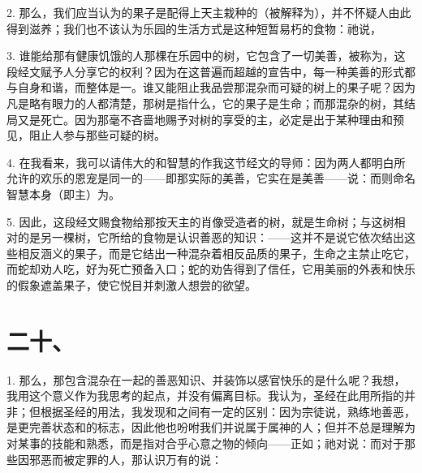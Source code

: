 2. 那么，我们应当认为的果子是配得上天主栽种的（被解释为），并不怀疑人由此得到滋养；我们也不该认为乐园的生活方式是这种短暂易朽的食物：祂说，\par

3. 谁能给那有健康饥饿的人那棵在乐园中的树，它包含了一切美善，被称为，这段经文赋予人分享它的权利？因为在这普遍而超越的宣告中，每一种美善的形式都与自身和谐，而整体是一。谁又能阻止我品尝那混杂而可疑的树上的果子呢？因为凡是略有眼力的人都清楚，那树是指什么，它的果子是生命；而那混杂的树，其结局又是死亡。因为那毫不吝啬地赐予对树的享受的主，必定是出于某种理由和预见，阻止人参与那些可疑的树。\par

4. 在我看来，我可以请伟大的和智慧的作我这节经文的导师：因为两人都明白所允许的欢乐的恩宠是同一的——即那实际的美善，它实在是美善——说：而则命名智慧本身（即主）为。\par

5. 因此，这段经文赐食物给那按天主的肖像受造者的树，就是生命树；与这树相对的是另一棵树，它所给的食物是认识善恶的知识：——这并不是说它依次结出这些相反涵义的果子，而是它结出一种混杂着相反品质的果子，生命之主禁止吃它，而蛇却劝人吃，好为死亡预备入口；蛇的劝告得到了信任，它用美丽的外表和快乐的假象遮盖果子，使它悦目并刺激人想尝的欲望。\par


\section{二十、 }

1. 那么，那包含混杂在一起的善恶知识、并装饰以感官快乐的是什么呢？我想，我用这个意义作为我思考的起点，并没有偏离目标。我认为，圣经在此用所指的并非；但根据圣经的用法，我发现和之间有一定的区别：因为宗徒说，熟练地善恶，是更完善状态和的标志，因此他也吩咐我们并说属于属神的人；但并不总是理解为对某事的技能和熟悉，而是指对合乎心意之物的倾向——正如；祂对说：而对于那些因邪恶而被定罪的人，那认识万有的说：\par

